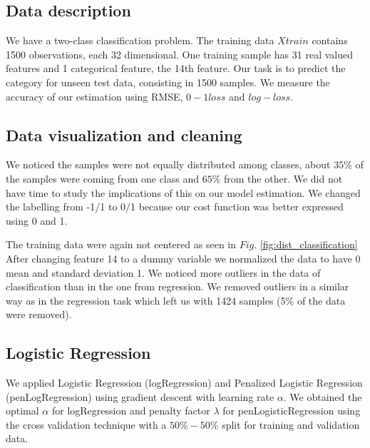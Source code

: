 \subsection{Data description}
We have a two-class classification problem. The training data $Xtrain$ contains 1500 observations, each 32 dimensional. One training sample has 31 real valued features and 1 categorical feature, the 14th feature. Our task is to predict the category for unseen test data, consisting in 1500 samples. We measure the accuracy of our estimation using RMSE, $0-1 loss$ and $log-loss$. 

\subsection{Data visualization and cleaning}
We noticed the samples were not equally distributed among classes, about $35\%$ of the samples were coming from one class and $65\%$ from the other. We did not have time to study the implications of this on our model estimation. We changed the labelling from -1/1 to 0/1 because our cost function was better expressed using 0 and 1.

The training data were again not centered as seen in $Fig.$ \ref{fig:dist_classification}
After changing feature 14 to a dummy variable we normalized the data to have 0 mean and standard deviation 1. We noticed more outliers in the data of classification than in the one from regression. We removed outliers in a similar way as in the regression task which left us with 1424 samples (5$\%$ of the data were removed).

\subsection{Logistic Regression}

We applied Logistic Regression (logRegression) and Penalized Logistic Regression (penLogRegression) using gradient descent with learning rate $\alpha$.  We obtained the optimal $\alpha$ for logRegression and penalty factor $\lambda$ for penLogisticRegression using the cross validation technique with a $50\%-50\%$ split for training and validation data.

